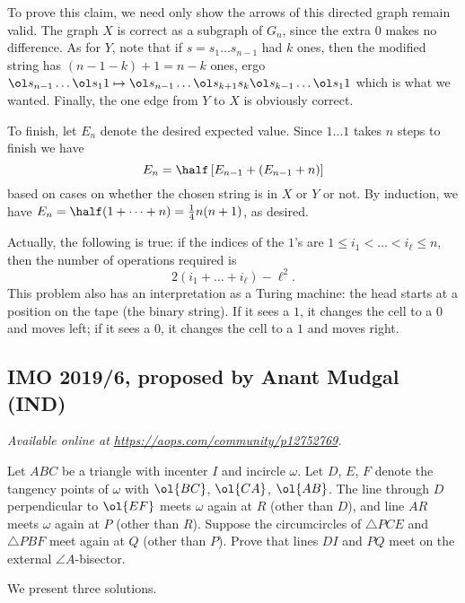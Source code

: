 \documentclass[11pt]{scrartcl}
\begin{document}
To prove this claim, we need only show
the arrows of this directed graph remain valid.
The graph $X$ is correct as a subgraph of $G_n$,
since the extra $0$ makes no difference.
As for $Y$, note that if $s = s_1 \dots s_{n-1}$ had $k$ ones,
then the modified string has $(n-1-k)+1 = n-k$ ones, ergo
$\ol s_{n-1} \dots \ol s_1 1
\mapsto  \ol s_{n-1} \dots \ol s_{k+1} s_k \ol s_{k-1} \dots \ol s_1 1$
which is what we wanted.
Finally, the one edge from $Y$ to $X$ is obviously correct.

To finish, let $E_n$ denote the desired expected value.
Since $1 \dots 1$ takes $n$ steps to finish we have
\[ E_n = \half \left[ E_{n-1} + (E_{n-1}+n) \right] \]
based on cases on whether the chosen string is in $X$ or $Y$ or not.
By induction, we have $E_n = \half (1 + \dots + n) = \frac14 n(n+1)$,
as desired.

\begin{remark*}
  Actually, the following is true:
  if the indices of the $1$'s are $1 \le i_1 < \dots < i_\ell \le n$,
  then the number of operations required is
  \[ 2(i_1 + \dots + i_\ell) - \ell^2. \]
  This problem also has an interpretation as a Turing machine:
  the head starts at a position on the tape (the binary string).
  If it sees a $1$, it changes the cell to a $0$ and moves left;
  if it sees a $0$, it changes the cell to a $1$ and moves right.
\end{remark*}
\pagebreak

\subsection{IMO 2019/6, proposed by Anant Mudgal (IND)}
\textsl{Available online at \url{https://aops.com/community/p12752769}.}
\begin{mdframed}[style=mdpurplebox,frametitle={Problem statement}]
Let $ABC$ be a triangle with incenter $I$ and incircle $\omega$.
Let $D$, $E$, $F$ denote the tangency points of $\omega$
with $\ol{BC}$, $\ol{CA}$, $\ol{AB}$.
The line through $D$ perpendicular to $\ol{EF}$
meets $\omega$ again at $R$ (other than $D$),
and line $AR$ meets $\omega$ again at $P$ (other than $R$).
Suppose the circumcircles of $\triangle PCE$ and $\triangle PBF$
meet again at $Q$ (other than $P$).
Prove that lines $DI$ and $PQ$ meet on the external $\angle A$-bisector.
\end{mdframed}
We present three solutions.
\end{document}
